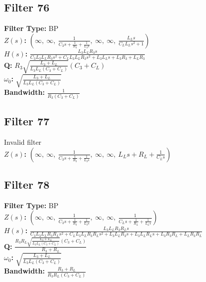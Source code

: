 \documentclass{article}
\begin{document}
\subsection*{Filter 76}
\textbf{Filter Type:} BP \\ 
\textbf{$Z(s)$:} $\left( \infty, \  \infty, \  \frac{1}{C_{3} s + \frac{1}{R_{3}} + \frac{1}{L_{3} s}}, \  \infty, \  \infty, \  \frac{L_{L} s}{C_{L} L_{L} s^{2} + 1}\right)$ \\ 
\textbf{$H(s)$:} $\frac{L_{3} L_{L} R_{3} s}{C_{3} L_{3} L_{L} R_{3} s^{2} + C_{L} L_{3} L_{L} R_{3} s^{2} + L_{3} L_{L} s + L_{3} R_{3} + L_{L} R_{3}}$ \\ 
\textbf{Q:} $R_{3} \sqrt{\frac{L_{3} + L_{L}}{L_{3} L_{L} \left(C_{3} + C_{L}\right)}} \left(C_{3} + C_{L}\right)$ \\ 
\textbf{$\omega_0$:} $\sqrt{\frac{L_{3} + L_{L}}{L_{3} L_{L} \left(C_{3} + C_{L}\right)}}$ \\ 
\textbf{Bandwidth:} $\frac{1}{R_{3} \left(C_{3} + C_{L}\right)}$ \\ 
\subsection*{Filter 77}
Invalid filter \\ 
\textbf{$Z(s)$:} $\left( \infty, \  \infty, \  \frac{1}{C_{3} s + \frac{1}{R_{3}} + \frac{1}{L_{3} s}}, \  \infty, \  \infty, \  L_{L} s + R_{L} + \frac{1}{C_{L} s}\right)$ \\ 
\subsection*{Filter 78}
\textbf{Filter Type:} BP \\ 
\textbf{$Z(s)$:} $\left( \infty, \  \infty, \  \frac{1}{C_{3} s + \frac{1}{R_{3}} + \frac{1}{L_{3} s}}, \  \infty, \  \infty, \  \frac{1}{C_{L} s + \frac{1}{R_{L}} + \frac{1}{L_{L} s}}\right)$ \\ 
\textbf{$H(s)$:} $\frac{L_{3} L_{L} R_{3} R_{L} s}{C_{3} L_{3} L_{L} R_{3} R_{L} s^{2} + C_{L} L_{3} L_{L} R_{3} R_{L} s^{2} + L_{3} L_{L} R_{3} s + L_{3} L_{L} R_{L} s + L_{3} R_{3} R_{L} + L_{L} R_{3} R_{L}}$ \\ 
\textbf{Q:} $\frac{R_{3} R_{L} \sqrt{\frac{L_{3} + L_{L}}{L_{3} L_{L} \left(C_{3} + C_{L}\right)}} \left(C_{3} + C_{L}\right)}{R_{3} + R_{L}}$ \\ 
\textbf{$\omega_0$:} $\sqrt{\frac{L_{3} + L_{L}}{L_{3} L_{L} \left(C_{3} + C_{L}\right)}}$ \\ 
\textbf{Bandwidth:} $\frac{R_{3} + R_{L}}{R_{3} R_{L} \left(C_{3} + C_{L}\right)}$ \\ 
\end{document}
